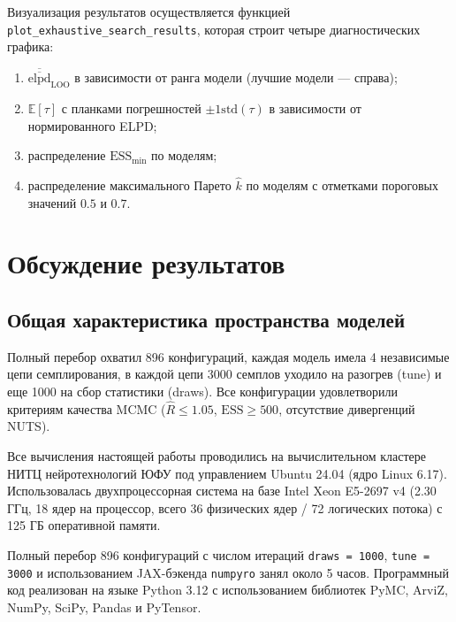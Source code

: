 \documentclass[14pt]{mmcs_article}
\begin{document}
	Визуализация результатов осуществляется функцией \linebreak
	\texttt{plot\_exhaustive\_search\_results}, которая строит
	четыре диагностических графика:
	\begin{enumerate}
		\item $\overline{\overline{\mathrm{elpd}}}_{\mathrm{LOO}}$
		в зависимости от ранга модели (лучшие модели —
		справа);
		\item $\mathbb{E}[\tau]$ с планками погрешностей
		$\pm 1 \mathrm{std}(\tau)$ в зависимости от
		нормированного ELPD;
		\item распределение $\mathrm{ESS}_{\min}$ по моделям;
		\item распределение максимального Парето $\hat{k}$ по
		моделям с отметками пороговых значений $0.5$ и $0.7$.
	\end{enumerate}
	
	\section{Обсуждение результатов}
	
	\subsection*{Общая характеристика пространства моделей}
	
	Полный перебор охватил 896 конфигураций, каждая модель имела 4 независимые цепи семплирования, в каждой цепи 3000 семплов уходило на разогрев (tune) и еще 1000 на сбор статистики (draws). Все конфигурации
	удовлетворили критериям качества MCMC ($\hat{R} \leq 1.05$,
	$\mathrm{ESS} \geq 500$, отсутствие дивергенций NUTS). 
	
	Все вычисления настоящей работы проводились на вычислительном
	кластере НИТЦ нейротехнологий ЮФУ под
	управлением Ubuntu 24.04 (ядро Linux 6.17). Использовалась
	двухпроцессорная система на базе Intel Xeon E5-2697 v4
	(2.30 ГГц, 18 ядер на процессор, всего 36 физических ядер /
	72 логических потока) с 125 ГБ оперативной памяти.
	
	Полный перебор 896 конфигураций с числом итераций
	\texttt{draws = 1000}, \texttt{tune = 3000} и использованием
	JAX-бэкенда \texttt{numpyro} занял около 5 часов. Программный код реализован на
	языке Python 3.12 с использованием библиотек PyMC, ArviZ,
	NumPy, SciPy, Pandas и PyTensor.
	
\end{document}
